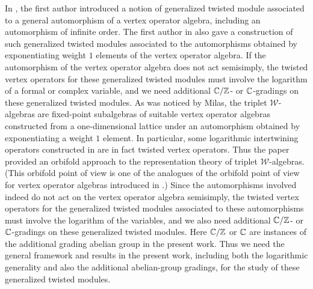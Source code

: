 \documentclass[12pt]{article}
\begin{document}
In \cite{H14}, the first author introduced a notion of generalized
twisted module associated to a general automorphism of a vertex
operator algebra, including an automorphism of infinite order.  The
first author in \cite{H14} also gave a construction of such
generalized twisted modules associated to the automorphisms obtained
by exponentiating weight $1$ elements of the vertex operator algebra.
If the automorphism of the vertex operator algebra does not act
semisimply, the twisted vertex operators for these generalized twisted
modules must involve the logarithm of a formal or complex variable,
and we need additional $\mathbb{C}/\mathbb{Z}$- or $\mathbb{C}$-gradings on these generalized
twisted modules.  As was noticed by Milas, the triplet
$\mathcal{W}$-algebras are fixed-point subalgebras of suitable vertex
operator algebras constructed from a one-dimensional lattice under an
automorphism obtained by exponentiating a weight $1$ element. In
particular, some logarithmic intertwining operators constructed in
\cite{AM4} are in fact twisted vertex operators. Thus the paper
\cite{H14} provided an orbifold approach to the representation theory
of triplet $\mathcal{W}$-algebras.  (This orbifold point of view is
one of the analogues of the orbifold point of view for vertex operator
algebras introduced in \cite{FLM2}.)  Since the automorphisms involved
indeed do not act on the vertex operator algebra semisimply, the
twisted vertex operators for the generalized twisted modules
associated to these automorphisms must involve the logarithm of the
variables, and we also need additional $\mathbb{C}/\mathbb{Z}$- or $\mathbb{C}$-gradings on
these generalized twisted modules.  Here $\mathbb{C}/\mathbb{Z}$ or $\mathbb{C}$ are instances
of the additional grading abelian group in the present work.  Thus we
need the general framework and results in the present work, including
both the logarithmic generality and also the additional abelian-group
gradings, for the study of these generalized twisted modules.
\end{document}
